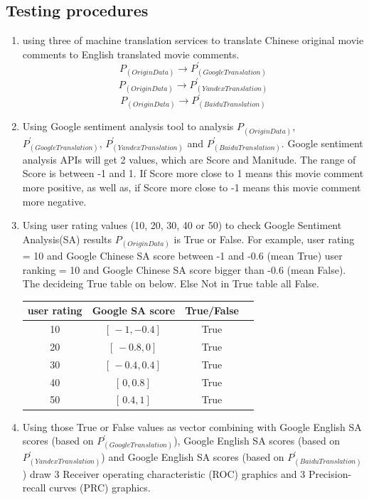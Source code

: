 \documentclass[conference]{IEEEtran}
\begin{document}
\subsection{Testing procedures}
\begin{enumerate}
  \item using three of machine translation services to translate Chinese
    original movie comments to English translated movie comments.
    $$P_{(Origin Data)} \rightarrow P^{\prime}_{(Google Translation)}$$
    $$P_{(Origin Data)} \rightarrow P^{\prime}_{(Yandex Translation)}$$
    $$P_{(Origin Data)} \rightarrow P^{\prime}_{(Baidu Translation)}$$
  \item Using Google sentiment analysis tool to analysis $P_{(Origin Data)}$,
    $P^{\prime}_{(Google Translation)}$, $ P^{\prime}_{(Yandex Translation)}$ and $
    P^{\prime}_{(Baidu Translation)}$. Google sentiment analysis APIs will get 2
    values, which are Score and Manitude. The range of Score is between -1 and
    1. If Score more close to 1 means this movie comment more positive, as well
    as, if Score more close to -1 means this movie comment more negative.
  \item Using user rating values (10, 20, 30, 40 or 50) to check Google
    Sentiment Analysis(SA) results $P_{(Origin Data)} $ is True or False. For example, user rating = 10 and Google Chinese SA score between -1
    and -0.6 (mean True) user ranking = 10 and Google Chinese SA score bigger
    than -0.6 (mean False). The decideing True table on below. Else Not in True
    table all False.
    \begin{center}
      \begin{tabular}{|c|c|c|c|}
        \hline
        user rating & Google SA score & True/False \\
        \hline\hline
        10 & $[ \, -1, -0.4 ] \,$ & True \\
        \hline
        20 & $[ \, -0.8, 0 ] \,$ & True \\
        \hline
        30 & $[ \, -0.4, 0.4 ] \,$ & True \\
        \hline
        40 & $[ \, 0, 0.8 ] \,$ & True \\
        \hline
        50 & $[ \, 0.4, 1 ] \,$ & True \\
        \hline
      \end{tabular}
    \end{center}
  \item Using those True or False values as vector combining with Google English
    SA scores (based on $P^{\prime}_{(Google Translation)}$), Google English SA
    scores (based on $ P^{\prime}_{(Yandex Translation)}$) and Google English SA
    scores (based on $P^{\prime}_{(Baidu Translation)}$) draw 3 Receiver operating
    characteristic (ROC) graphics and 3 Precision-recall curves (PRC) graphics.


\end{enumerate}
\end{document}
